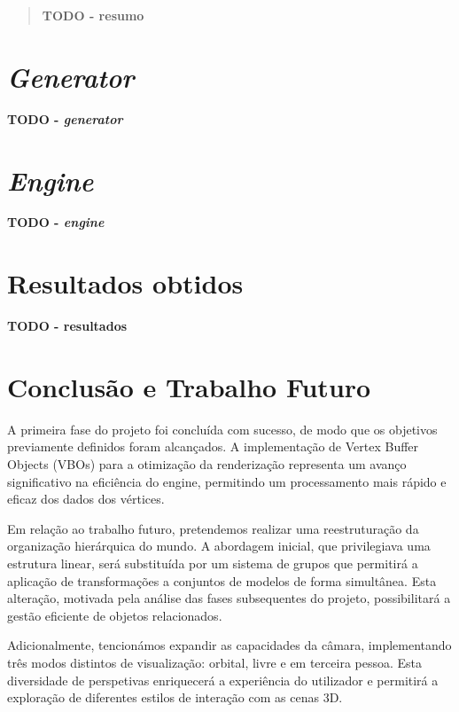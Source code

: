 \documentclass[12pt, a4paper]{article}
\begin{document}
\pagebreak

\begin{abstract}
    \textbf{\color{red} TODO - resumo}
\end{abstract}

\section{\emph{Generator}}

\textbf{\color{red} TODO - \emph{generator}}

\section{\emph{Engine}}

\textbf{\color{red} TODO - \emph{engine}}

\section{Resultados obtidos}

\textbf{\color{red} TODO - resultados}

\section{Conclusão e Trabalho Futuro}

A primeira fase do projeto foi concluída com sucesso, de modo que os objetivos previamente definidos
foram alcançados. A implementação de Vertex Buffer Objects (VBOs) para a otimização da renderização
representa um avanço significativo na eficiência do engine, permitindo um processamento mais rápido
e eficaz dos dados dos vértices.

Em relação ao trabalho futuro, pretendemos realizar uma reestruturação da organização hierárquica do
mundo. A abordagem inicial, que privilegiava uma estrutura linear, será substituída por um sistema
de grupos que permitirá a aplicação de transformações a conjuntos de modelos de forma simultânea.
Esta alteração, motivada pela análise das fases subsequentes do projeto, possibilitará a gestão
eficiente de objetos relacionados.

Adicionalmente, tencionámos expandir as capacidades da câmara, implementando três modos distintos de
visualização: orbital, livre e em terceira pessoa. Esta diversidade de perspetivas enriquecerá a
experiência do utilizador e permitirá a exploração de diferentes estilos de interação com as cenas
3D.
\end{document}
